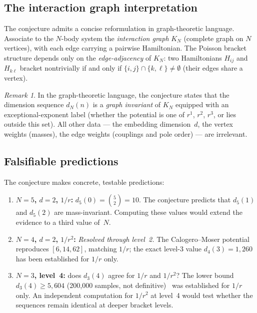\documentclass[11pt,a4paper]{article}
\theoremstyle{remark}
\newtheorem{remark}[theorem]{Remark}
\begin{document}
\subsection{The interaction graph interpretation}

The conjecture admits a concise reformulation in
graph-theoretic language.  Associate to the $N$-body
system the \emph{interaction graph} $K_N$ (complete graph
on $N$ vertices), with each edge carrying a pairwise
Hamiltonian.  The Poisson bracket structure depends only
on the \emph{edge-adjacency} of $K_N$: two Hamiltonians
$H_{ij}$ and $H_{k\ell}$ bracket nontrivially if and
only if $\{i,j\} \cap \{k,\ell\} \ne \emptyset$ (their
edges share a vertex).

\begin{remark}
In the graph-theoretic language, the conjecture states
that the dimension sequence $d_N(n)$ is a
\emph{graph invariant} of $K_N$ equipped with an
exceptional-exponent label (whether the potential is one
of $r^1$, $r^2$, $r^3$, or lies outside this set).  All
other data --- the
embedding dimension~$d$, the vertex weights (masses),
the edge weights (couplings and pole order) --- are
irrelevant.
\end{remark}

\subsection{Falsifiable predictions}

The conjecture makes concrete, testable predictions:

\begin{enumerate}[nosep]
  \item \textbf{$N{=}5$, $d{=}2$, $1/r$:}
    $d_5(0) = \binom{5}{2} = 10$.  The conjecture
    predicts that $d_5(1)$ and $d_5(2)$ are
    mass-invariant.  Computing these values would extend
    the evidence to a third value of~$N$.

  \item \textbf{$N{=}4$, $d{=}2$, $1/r^2$:} \emph{Resolved
    through level~2.}  The Calogero--Moser potential
    reproduces $[6, 14, 62]$, matching $1/r$; the exact
    level-3 value $d_4(3) = 1{,}260$ has been established
    for $1/r$ only.

  \item \textbf{$N{=}3$, level~4:}
    does $d_3(4)$ agree for $1/r$ and $1/r^2$?
    The lower bound $d_3(4) \ge 5{,}604$ (200{,}000 samples,
    not definitive)~\cite{paper1}
    was established for $1/r$ only.  An independent
    computation for $1/r^2$ at level~4 would test
    whether the sequences remain identical at deeper
    bracket levels.
\end{enumerate}
\end{document}
